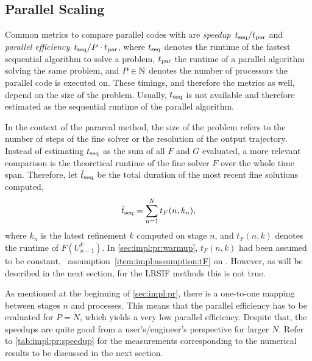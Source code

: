 \subsection{Parallel Scaling}

Common metrics to compare parallel codes with are \emph{speedup}~$t_\text{seq}/t_\text{par}$
and \emph{parallel efficiency}~$t_\text{seq}/P\cdot t_\text{par}$,
where $t_\text{seq}$ denotes the runtime of the fastest sequential algorithm to solve a problem,
$t_\text{par}$ the runtime of a parallel algorithm solving the same problem,
and $P\in\mathbb{N}$ denotes the number of processors the parallel code is executed on.
These timings, and therefore the metrics as well, depend on the size of the problem.
Usually, $t_\text{seq}$ is not available and therefore estimated as the sequential runtime of the parallel algorithm.

In the context of the parareal method,
the size of the problem refers to the number of steps of the fine solver or the resolution of the output trajectory.
Instead of estimating $t_\text{seq}$ as the sum of all $F$ and $G$ evaluated,
a more relevant comparison is the theoretical runtime of the fine solver $F$ over the whole time span.
Therefore, let $\hat t_\text{seq}$ be the total duration of the most recent fine solutions computed,
\begin{equation}
\label{eq:impl:tseq}
  \hat t_\text{seq} = \sum_{n=1}^N t_F(n, k_n)
  ,
\end{equation}
where $k_n$ is the latest refinement $k$ computed on stage $n$,
and $t_F(n,k)$ denotes the runtime of $F(U_{n-1}^k)$.
In \autoref{sec:impl:pr:warmup},
$t_F(n,k)$ had been assumed to be constant,
\cf~assumption~\ref{item:impl:assumption:tF} on .
However, as will be described in the next section,
for the \ac{LRSIF} methods this is not true.

As mentioned at the beginning of \autoref{sec:impl:pr},
there is a one-to-one mapping between stages $n$ and processes.
This means that the parallel efficiency has to be evaluated for $P=N$,
which yields a very low parallel efficiency.
Despite that, the speedups are quite good from a user's/engineer's perspective for larger $N$.
Refer to \autoref{tab:impl:pr:speedup} for the measurements corresponding to the numerical results
to be discussed in the next section.



